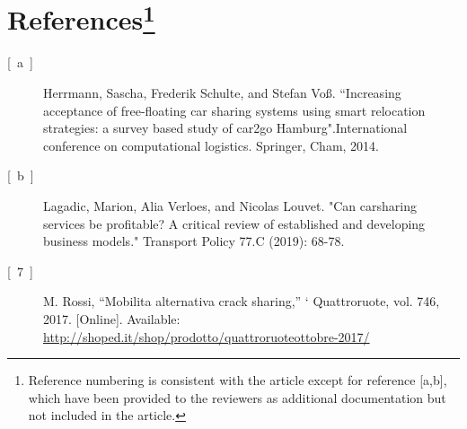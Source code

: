 \documentclass{paper}
\begin{document}
\section*{References\footnote{Reference numbering is consistent with the article except for reference [a,b], which have been provided to the reviewers as additional documentation but not included in the article.}}


\begin{description}

\item[{[~a~]}] Herrmann, Sascha, Frederik Schulte, and Stefan Vo{\ss}. ``Increasing acceptance of free-floating car sharing systems using smart relocation strategies: a survey based study of car2go Hamburg".International conference on computational logistics. Springer, Cham, 2014.


\item[{[~b~]}] Lagadic, Marion, Alia Verloes, and Nicolas Louvet. "Can carsharing services be profitable? A critical review of established and developing business models." Transport Policy 77.C (2019): 68-78.


\item[{[~7~]}] M. Rossi, “Mobilita alternativa crack sharing,” ` Quattroruote, vol. 746,
2017. [Online]. Available: \url{http://shoped.it/shop/prodotto/quattroruoteottobre-2017/}





\end{description}
\end{document}
